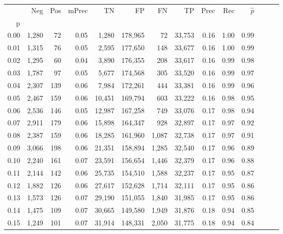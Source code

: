 \begin{tabular}{rrrrrrrrrrrrrr}
\toprule
{} &    Neg &  Pos & mPrec &       TN &       FP &      FN &      TP &  Prec &   Rec & $\hat{p}$ \\
p    &        &      &       &          &          &         &         &       &       &           \\
\midrule
0.00 &  1,280 &   72 &  0.05 &    1,280 &  178,965 &      72 &  33,753 &  0.16 &  1.00 &      0.99 \\
0.01 &  1,315 &   76 &  0.05 &    2,595 &  177,650 &     148 &  33,677 &  0.16 &  1.00 &      0.99 \\
0.02 &  1,295 &   60 &  0.04 &    3,890 &  176,355 &     208 &  33,617 &  0.16 &  0.99 &      0.98 \\
0.03 &  1,787 &   97 &  0.05 &    5,677 &  174,568 &     305 &  33,520 &  0.16 &  0.99 &      0.97 \\
0.04 &  2,307 &  139 &  0.06 &    7,984 &  172,261 &     444 &  33,381 &  0.16 &  0.99 &      0.96 \\
0.05 &  2,467 &  159 &  0.06 &   10,451 &  169,794 &     603 &  33,222 &  0.16 &  0.98 &      0.95 \\
0.06 &  2,536 &  146 &  0.05 &   12,987 &  167,258 &     749 &  33,076 &  0.17 &  0.98 &      0.94 \\
0.07 &  2,911 &  179 &  0.06 &   15,898 &  164,347 &     928 &  32,897 &  0.17 &  0.97 &      0.92 \\
0.08 &  2,387 &  159 &  0.06 &   18,285 &  161,960 &   1,087 &  32,738 &  0.17 &  0.97 &      0.91 \\
0.09 &  3,066 &  198 &  0.06 &   21,351 &  158,894 &   1,285 &  32,540 &  0.17 &  0.96 &      0.89 \\
0.10 &  2,240 &  161 &  0.07 &   23,591 &  156,654 &   1,446 &  32,379 &  0.17 &  0.96 &      0.88 \\
0.11 &  2,144 &  142 &  0.06 &   25,735 &  154,510 &   1,588 &  32,237 &  0.17 &  0.95 &      0.87 \\
0.12 &  1,882 &  126 &  0.06 &   27,617 &  152,628 &   1,714 &  32,111 &  0.17 &  0.95 &      0.86 \\
0.13 &  1,573 &  126 &  0.07 &   29,190 &  151,055 &   1,840 &  31,985 &  0.17 &  0.95 &      0.86 \\
0.14 &  1,475 &  109 &  0.07 &   30,665 &  149,580 &   1,949 &  31,876 &  0.18 &  0.94 &      0.85 \\
0.15 &  1,249 &  101 &  0.07 &   31,914 &  148,331 &   2,050 &  31,775 &  0.18 &  0.94 &      0.84 \\

\end{tabular}
